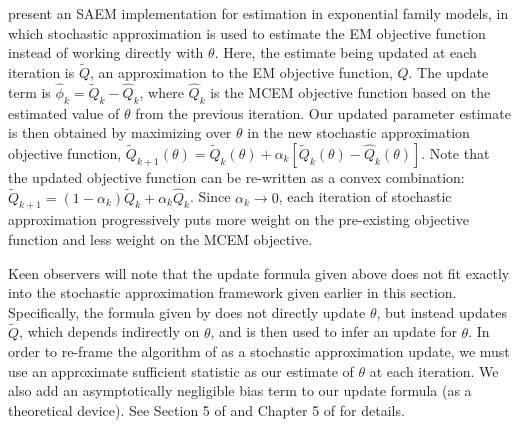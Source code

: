 \documentclass[11pt, oneside]{article}   	%
\begin{document}
\citet{Del99} present an SAEM implementation for estimation in exponential family models, in which stochastic approximation is used to estimate the EM objective function instead of working directly with $\theta$. Here, the estimate being updated at each iteration is $\tilde{Q}$, an approximation to the EM objective function, $Q$. The update term is $\hat{\phi}_k = \tilde{Q}_k - \hat{Q}_k$, where $\hat{Q}_k$ is the MCEM objective function based on the estimated value of $\theta$ from the previous iteration. Our updated parameter estimate is then obtained by maximizing over $\theta$ in the new stochastic approximation objective function, $\tilde{Q}_{k+1}(\theta) = \tilde{Q}_k(\theta) + \alpha_k [ \tilde{Q}_k(\theta) - \hat{Q}_k(\theta)]$. Note that the updated objective function can be re-written as a convex combination: $\tilde{Q}_{k+1} = (1 - \alpha_k) \tilde{Q}_k + \alpha_k \hat{Q}_k$. Since $\alpha_k \rightarrow 0$, each iteration of stochastic approximation progressively puts more weight on the pre-existing objective function and less weight on the MCEM objective.

Keen observers will note that the update formula given above does not fit exactly into the stochastic approximation framework given earlier in this section. Specifically, the formula given by \citet{Del99} does not directly update $\theta$, but instead updates $\tilde{Q}$, which depends indirectly on $\theta$, and is then used to infer an update for $\theta$. In order to re-frame the algorithm of \citeauthor{Del99} as a stochastic approximation update, we must use an approximate sufficient statistic as our estimate of $\theta$ at each iteration. We also add an asymptotically negligible bias term to our update formula (as a theoretical device). See Section 5 of \citet{Del99} and Chapter 5 of \citet{Kus03} for details.

\end{document}
